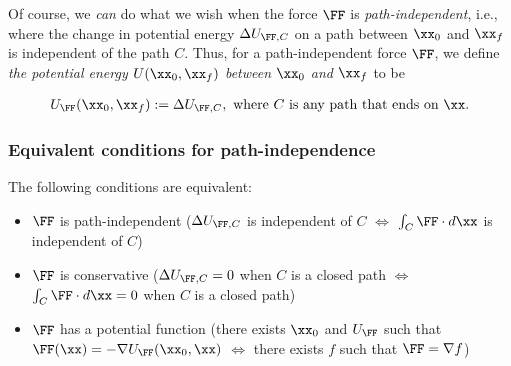 \documentclass{article}
\begin{document}
Of course, we \textit{can} do what we wish when the force $\FF$ is \textit{path-independent}, i.e., where the change in potential energy $\Delta U_{\FF, C}$ on a path between $\xx_0$ and $\xx_f$ is independent of the path $C$. Thus, for a path-independent force $\FF$, we define \textit{the potential energy $U(\xx_0, \xx_f)$ between $\xx_0$ and $\xx_f$} to be

\begin{align*}
    U_{\FF}(\xx_0, \xx_f) := \Delta U_{\FF, C}, \text{ where $C$ is any path that ends on $\xx$}.
\end{align*}

\subsubsection*{Equivalent conditions for path-independence}

The following conditions are equivalent:

\begin{itemize}
    \item $\FF$ is path-independent ($\Delta U_{\FF, C}$ is independent of $C$ $\iff$ $\int_C \FF \cdot d\xx$ is independent of $C$)
    \item $\FF$ is conservative ($\Delta U_{\FF, C} = 0$ when $C$ is a closed path $\iff$ $\int_C \FF \cdot d\xx = 0$ when $C$ is a closed path)
    \item $\FF$ has a potential function (there exists $\xx_0$ and $U_{\FF}$ such that $\FF(\xx) = - \nabla U_{\FF}(\xx_0, \xx)$ $\iff$ there exists $f$ such that $\FF = \nabla f$)
\end{itemize}
\end{document}
